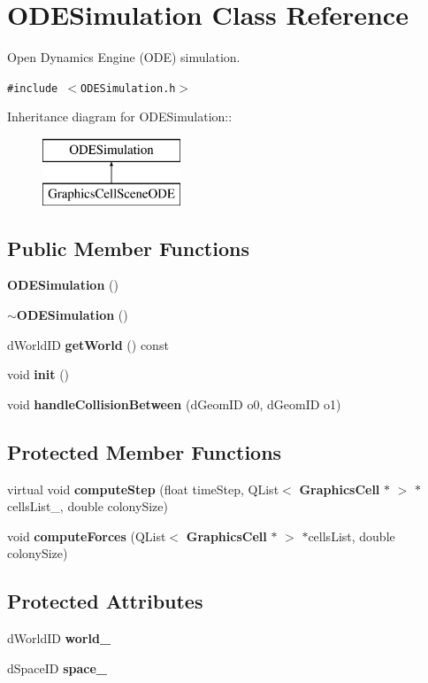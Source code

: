 \section{ODESimulation Class Reference}
\label{classODESimulation}
Open Dynamics Engine (ODE) simulation.  


{\tt \#include $<$ODESimulation.h$>$}

Inheritance diagram for ODESimulation::\begin{figure}[H]
\begin{center}
\leavevmode
\includegraphics[height=2cm]{classODESimulation}
\end{center}
\end{figure}
\subsection*{Public Member Functions}
\begin{CompactItemize}
\item 
{\bf ODESimulation} ()
\item 
{\bf $\sim$ODESimulation} ()
\item 
dWorldID {\bf getWorld} () const 
\item 
void {\bf init} ()
\item 
void {\bf handleCollisionBetween} (dGeomID o0, dGeomID o1)
\end{CompactItemize}
\subsection*{Protected Member Functions}
\begin{CompactItemize}
\item 
virtual void {\bf computeStep} (float timeStep, QList$<$ {\bf GraphicsCell} $\ast$ $>$ $\ast$cellsList\_\-, double colonySize)
\item 
void {\bf computeForces} (QList$<$ {\bf GraphicsCell} $\ast$ $>$ $\ast$cellsList, double colonySize)
\end{CompactItemize}
\subsection*{Protected Attributes}
\begin{CompactItemize}
\item 
dWorldID {\bf world\_\-}
\item 
dSpaceID {\bf space\_\-}
\end{CompactItemize}

